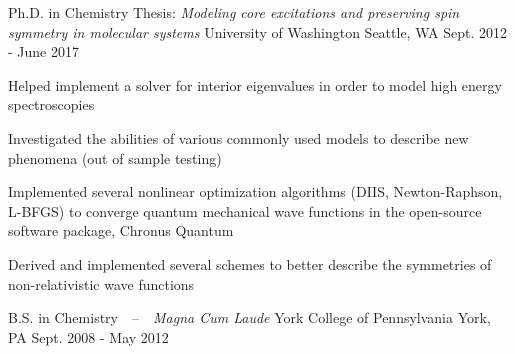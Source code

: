 


\begin{cventries}


\cventry
{Ph.D. in Chemistry \newline
Thesis: \textit{Modeling core excitations and preserving spin symmetry in molecular systems}} %
{University of Washington} %
{Seattle, WA\vspace{-0.5cm}} %
{Sept. 2012 - June 2017} %
{\begin{cvitems}
\item{Helped implement a solver for interior eigenvalues in order to model high energy spectroscopies}
\item{Investigated the abilities of various commonly used models to describe new phenomena (out of sample testing)}
\item{Implemented several nonlinear optimization algorithms (DIIS, Newton-Raphson, L-BFGS) to converge quantum mechanical wave functions in the open-source software package, Chronus Quantum}
\item{Derived and implemented several schemes to better describe the symmetries of non-relativistic wave functions}
\end{cvitems}
}



\cventry
{B.S. in Chemistry~~--~~\textit{Magna Cum Laude}} %
{York College of Pennsylvania} %
{York, PA} %
{Sept. 2008 - May 2012} %
{}


\end{cventries}
